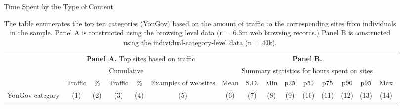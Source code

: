 \documentclass[12pt,twoside]{article}
\begin{document}
\begin{landscape}%
    \begin{table}[ht] \centering \small \setlength\tabcolsep{3 pt} \setlength{\defaultaddspace}{0pt}
    \def\sym#1{\ifmmode^{#1}\else\(^{#1}\)\fi}
    \caption{Time Spent by the Type of Content}
    \label{tab:top10cat_description}
	\begin{adjustbox}{max width=1.325\textwidth}
            \begin{tabular}{@{\hspace{0\tabcolsep}}lrrrrrrrrrrrrrr@{\hspace{0\tabcolsep}}}
            \toprule\toprule
            &\multicolumn{5}{c}{\textbf{Panel A.} Top sites based on traffic}&\multicolumn{9}{c}{\textbf{Panel B.}}\\
            \cmidrule(lr){2-6}
            &&&\multicolumn{2}{c}{Cumulative}&&\multicolumn{9}{c}{Summary statistics for hours spent on sites}\\
            \cmidrule(l){4-5}\cmidrule{7-15}
            &\multicolumn{1}{c}{Traffic}&\multicolumn{1}{c}{\%}&\multicolumn{1}{c}{Traffic}&\multicolumn{1}{c}{\%}&\multicolumn{1}{c}{Examples of websites}&\multicolumn{1}{c}{Mean}&\multicolumn{1}{c}{S.D.}&\multicolumn{1}{c}{Min}&\multicolumn{1}{c}{p25}&\multicolumn{1}{c}{p50}&\multicolumn{1}{c}{p75}&\multicolumn{1}{c}{p90}&\multicolumn{1}{c}{p95}&\multicolumn{1}{c}{Max}\\
            \cmidrule(l){2-5}
            YouGov category&\multicolumn{1}{c}{(1)}&\multicolumn{1}{c}{(2)}&\multicolumn{1}{c}{(3)}&\multicolumn{1}{c}{(4)}&\multicolumn{1}{c}{(5)}&\multicolumn{1}{c}{(6)}&\multicolumn{1}{c}{(7)}&\multicolumn{1}{c}{(8)}&\multicolumn{1}{c}{(9)}&\multicolumn{1}{c}{(10)}&\multicolumn{1}{c}{(11)}&\multicolumn{1}{c}{(12)}&\multicolumn{1}{c}{(13)}&\multicolumn{1}{c}{(14)} \\
            \midrule
            \\       
            \bottomrule
        \end{tabular}
        \end{adjustbox}
        \caption*{\scriptsize
        The table enumerates the top ten categories (YouGov) based on the amount of traffic to the corresponding sites from individuals in the sample.
        Panel A is constructed using the browsing level data (n = 6.3m web browsing records.) Panel B is constructed using the individual-category-level data (n = 40k).
        }
    \end{table}
\end{landscape}
\end{document}
